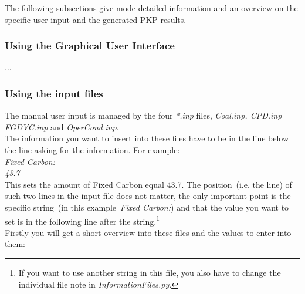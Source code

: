 The following subsections give mode detailed information and an overview on the specific user input and the generated PKP results.


\subsubsection{Using the Graphical User Interface}\label{SSS_GUI}
...
\subsubsection{Using the input files}\label{SSS_inp}
The manual user input is managed by the four \emph{*.inp} files, \emph{Coal.inp, CPD.inp} \emph{FGDVC.inp} and \emph{OperCond.inp}.\\
The information you want to insert into these files have to be in the line below the line asking for the information. For example:\\

\noindent \emph{Fixed Carbon:\\
43.7}\\

This sets the amount of Fixed Carbon equal 43.7. The position~(i.e. the line) of such two lines in the input file does not matter, the only important point is the specific string~(in this example~\emph{Fixed Carbon:}) and that the value you want to set is in the following line after the string.\footnote{If you want to use another string in this file, you also have to change the individual file note in \emph{InformationFiles.py}.}\\
Firstly you will get a short overview into these files and the values to enter into them:\\
